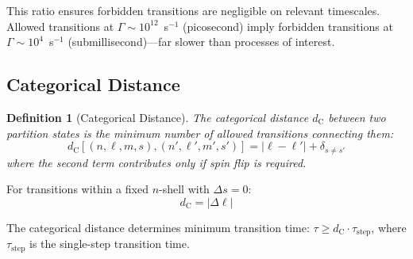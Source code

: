 \documentclass[twocolumn,aps,prb,superscriptaddress,longbibliography,floatfix]{revtex4-2}
\newtheorem{definition}[theorem]{Definition}
\theoremstyle{remark}
\newcommand{\dC}{d_\text{C}}
\begin{document}
This ratio ensures forbidden transitions are negligible on relevant
timescales. Allowed transitions at $\Gamma \sim 10^{12}$~s$^{-1}$
(picosecond) imply forbidden transitions at $\Gamma \sim 10^{4}$~s$^{-1}$
(submillisecond)---far slower than processes of interest.

\subsection{Categorical Distance}

\begin{definition}[Categorical Distance]
\label{def:categorical_distance}
The categorical distance $\dC$ between two partition states is the minimum
number of allowed transitions connecting them:
\begin{equation}
\dC[(n,\ell,m,s), (n',\ell',m',s')] = |\ell - \ell'| + \delta_{s \neq s'}
\end{equation}
where the second term contributes only if spin flip is required.
\end{definition}

For transitions within a fixed $n$-shell with $\Delta s = 0$:
\begin{equation}
\dC = |\Delta \ell|
\end{equation}

The categorical distance determines minimum transition time:
$\tau \geq \dC \cdot \tau_\text{step}$, where $\tau_\text{step}$ is the
single-step transition time.
\end{document}
